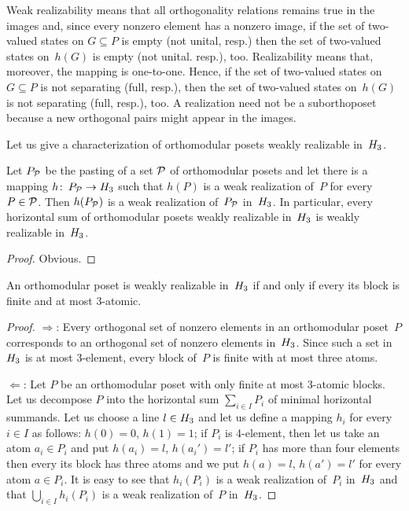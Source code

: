 Weak realizability means that all orthogonality relations remains true in
the images and, since every nonzero element has a nonzero image, if the set
of two-valued states on $G \subseteq P$ is empty (not unital, resp.) then
the set of two-valued states on~$h(G)$ is empty (not unital. resp.), too.
Realizability means that, moreover, the mapping is one-to-one. Hence, if the
set of two-valued states on $G \subseteq P$ is not separating (full, resp.),
then the set of two-valued states on~$h(G)$ is not separating (full, resp.),
too. A realization need not be a suborthoposet because a new orthogonal
pairs might appear in the images.

Let us give a characterization of orthomodular posets weakly realizable
in~$H_3$.


\begin {lemma}
Let $P_{\cal P}$ be the pasting of a set ${\cal P}$ of orthomodular posets
and let there is a mapping $h\colon\, P_{\cal P} \to H_3$ such that $h(P)$
is a weak realization of~$P$ for every $P\in {\cal P}$. Then $h(P_{\cal P})$
is a weak realization of~$P_{\cal P}$ in~$H_3$. In particular, every
horizontal sum of orthomodular posets weakly realizable in~$H_3$ is weakly
realizable in~$H_3$.
\end {lemma}


\begin {proof}
Obvious.
\end {proof}

\begin {proposition}
An orthomodular poset is weakly realizable in~$H_3$ if and only if every its
block is finite and at most 3-atomic.
\end {proposition}


\begin {proof}
$\Rightarrow$: Every orthogonal set of nonzero elements in an orthomodular
poset~$P$ corresponds to an orthogonal set of nonzero elements in~$H_3$.
Since such a set in~$H_3$ is at most 3-element, every block of~$P$ is finite
with at most three atoms.

$\Leftarrow$: Let $P$ be an orthomodular poset with only finite at most
3-atomic blocks. Let us decompose $P$ into the horizontal sum $\sum_{i \in
I} P_i$ of minimal horizontal summands. Let us choose a line $l \in H_3$ and
let us define a mapping $h_i$ for every $i \in I$ as follows: $h(0)=0$,
$h(1)=1$; if $P_i$ is 4-element, then let us take an atom $a_i \in P_i$ and
put $h(a_i)=l$, $h(a_i')=l'$; if $P_i$ has more than four elements then
every its block has three atoms and we put $h(a)=l$, $h(a')=l'$ for every
atom $a \in P_i$. It is easy to see that $h_i(P_i)$ is a weak realization
of~$P_i$ in~$H_3$ and that $\bigcup_{i \in I} h_i(P_i)$ is a weak realization
of~$P$ in~$H_3$.
\end {proof}



